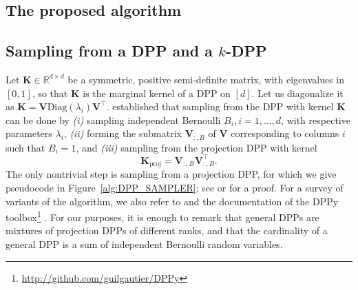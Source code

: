 \documentclass[twoside,11pt]{book}
\newcommand{\rev}[1]{\textcolor{darkgreen}{#1}}
\DeclareMathOperator{\Span}{\mathrm{Span}}
\DeclareMathOperator{\Tran}{\intercal}
\newcommand{\ar}[1]{\textcolor{magenta}{~\algoremark{#1}}}
\begin{document}

\subsection{The proposed algorithm}



\subsection{Sampling from a DPP and a $k$-DPP}
\label{subsec:sampling_from_a_dpp}
Let $\bm{K}\in\mathbb{R}^{d\times d}$ be a symmetric, positive semi-definite matrix, with eigenvalues in $[0,1]$, so that $\bm{K}$ is the marginal kernel of a DPP on $[d]$. Let us diagonalize it as $\bm{K} = \bm{V}\text{Diag}(\lambda_i)\bm{V}^{\Tran}$. \cite{HoKrPeVi06} established that sampling from the DPP with kernel $\bm K$ can be done by \emph{(i)} sampling independent Bernoulli $B_i, i=1,\dots,d$, with respective parameters $\lambda_i$, \emph{(ii)} forming the submatrix $\bm V_{:,B}$ of $\bm V$ corresponding to columns $i$ such that $B_i=1$, and \emph{(iii)} sampling from the projection DPP with kernel
$$\bm{K}_\text{proj} = \bm{V}_{:,B}\bm{V}_{:,B}^{\Tran}.$$
The only nontrivial step is sampling from a projection DPP, for which we give pseudocode in Figure~\ref{alg:DPP_SAMPLER}; see \cite[Theorem 7]{HoKrPeVi06} or \cite[Theorem 2.3]{KuTa12} for a proof. For a survey of variants of the algorithm, we also refer to \citep*{TrBaAm18} and the documentation of the DPPy toolbox\footnote{\url{http://github.com/guilgautier/DPPy}} \citep*{GaBaVa18}. For our purposes, it is enough to remark that general DPPs are mixtures of projection DPPs of different ranks, and that the cardinality of a general DPP is a sum of independent Bernoulli random variables.

\end{document}

